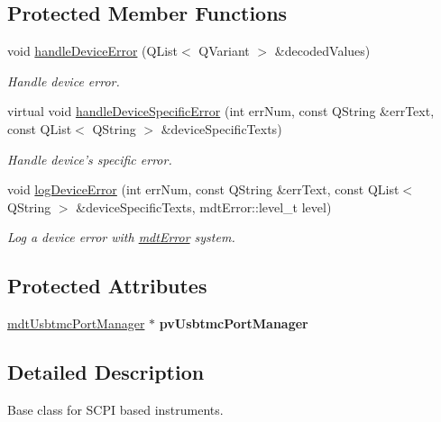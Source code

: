 \subsection*{Protected Member Functions}
\begin{DoxyCompactItemize}
\item 
void \hyperlink{classmdt_device_scpi_a480697b6b78665bfc59fd2bffcf4b566}{handleDeviceError} (QList$<$ QVariant $>$ \&decodedValues)
\begin{DoxyCompactList}\small\item\em Handle device error. \end{DoxyCompactList}\item 
virtual void \hyperlink{classmdt_device_scpi_af1cc7d9c99832fa3a7b3c5764588c637}{handleDeviceSpecificError} (int errNum, const QString \&errText, const QList$<$ QString $>$ \&deviceSpecificTexts)
\begin{DoxyCompactList}\small\item\em Handle device's specific error. \end{DoxyCompactList}\item 
void \hyperlink{classmdt_device_scpi_a00d25c16acb20c909210bc5278f713fa}{logDeviceError} (int errNum, const QString \&errText, const QList$<$ QString $>$ \&deviceSpecificTexts, mdtError::level\_\-t level)
\begin{DoxyCompactList}\small\item\em Log a device error with \hyperlink{classmdt_error}{mdtError} system. \end{DoxyCompactList}\end{DoxyCompactItemize}
\subsection*{Protected Attributes}
\begin{DoxyCompactItemize}
\item 
\hypertarget{classmdt_device_scpi_a6f7bd859a14eddbaab64f492777c1337}{
\hyperlink{classmdt_usbtmc_port_manager}{mdtUsbtmcPortManager} $\ast$ {\bfseries pvUsbtmcPortManager}}
\label{classmdt_device_scpi_a6f7bd859a14eddbaab64f492777c1337}

\end{DoxyCompactItemize}


\subsection{Detailed Description}
Base class for SCPI based instruments. 

